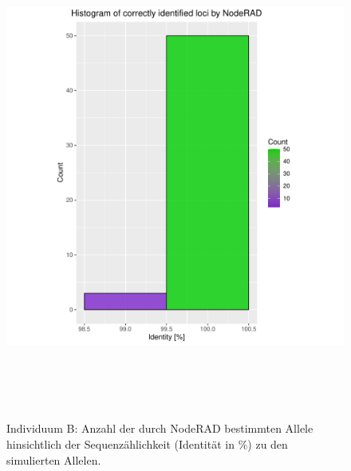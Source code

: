 \begin{figure}[H]
	\begin{center}
		\includegraphics[height=16cm]{bilder/evaluation/hist_perc_ident/B.plot_hist.pdf}
		\caption{Individuum B: Anzahl der durch NodeRAD bestimmten Allele hinsichtlich der Sequenzählichkeit (Identität in $ \% $) zu den simulierten Allelen.}
	\end{center}
\end{figure}


